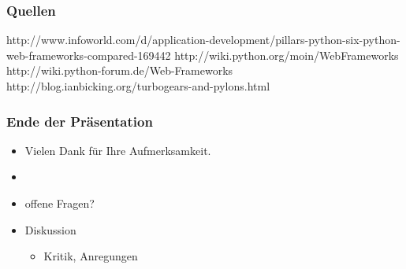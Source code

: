 \documentclass[
    t,
    smaller,
    compress,
]{beamer}
\begin{document}
\begin{frame}
  \frametitle{Quellen}
http://www.infoworld.com/d/application-development/pillars-python-six-python-web-frameworks-compared-169442
http://wiki.python.org/moin/WebFrameworks
http://wiki.python-forum.de/Web-Frameworks
http://blog.ianbicking.org/turbogears-and-pylons.html
\end{frame}


\begin{frame}
    \frametitle{Ende der Präsentation}
    \LARGE
    \begin{itemize}[<1->]
        \item Vielen Dank für Ihre Aufmerksamkeit.
        \item
        \item offene Fragen?
        \item Diskussion
        \begin{itemize}[<1->]
          \Large
          \item Kritik, Anregungen
        \end{itemize}
    \end{itemize}
\end{frame}
\end{document}
